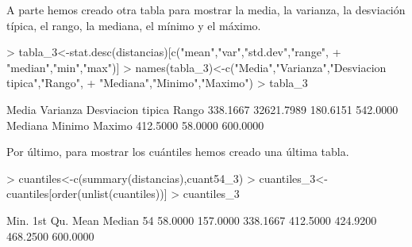 \documentclass[a4paper]{article}
\begin{document}
A parte hemos creado otra tabla para mostrar la media, la varianza, la desviación típica, el rango, la mediana, el mínimo y el máximo.
\begin{Schunk}
\begin{Sinput}
> tabla_3<-stat.desc(distancias)[c("mean","var","std.dev","range",
+                                    "median","min","max")]
> names(tabla_3)<-c("Media","Varianza","Desviacion tipica","Rango",
+                     "Mediana","Minimo","Maximo")
> tabla_3
\end{Sinput}
\begin{Soutput}
            Media          Varianza Desviacion tipica             Rango 
         338.1667        32621.7989          180.6151          542.0000 
          Mediana            Minimo            Maximo 
         412.5000           58.0000          600.0000 
\end{Soutput}
\end{Schunk}

Por último, para mostrar los cuántiles hemos creado una última tabla.
\begin{Schunk}
\begin{Sinput}
> cuantiles<-c(summary(distancias),cuant54_3)
> cuantiles_3<-cuantiles[order(unlist(cuantiles))]
> cuantiles_3
\end{Sinput}
\begin{Soutput}
    Min.  1st Qu.     Mean   Median      54%  3rd Qu.     Max. 
 58.0000 157.0000 338.1667 412.5000 424.9200 468.2500 600.0000 
\end{Soutput}
\end{Schunk}
\end{document}
